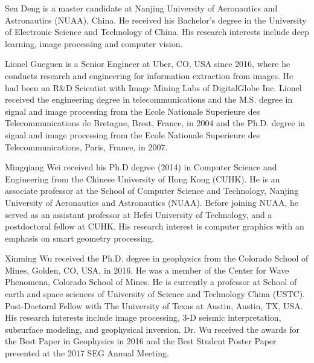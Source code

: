 \documentclass[journal]{IEEEtran}
\begin{document}
\begin{IEEEbiography}{Sen Deng}
is a master candidate at Nanjing University of Aeronautics and Astronautics (NUAA), China. He received his Bachelor's degree in the University of Electronic Science and Technology of China. His research interests include deep learning, image processing and computer vision.
\end{IEEEbiography}


\begin{IEEEbiography}{Lionel Gueguen}
 is a Senior Engineer at Uber, CO, USA since 2016, where he conducts research and engineering for information extraction from images. He had been an R\&D Scientist with Image Mining Labs of DigitalGlobe Inc. Lionel received the engineering degree in telecommunications and the M.S. degree in signal and image processing from the Ecole Nationale Superieure des Telecommunications de Bretagne, Brest, France, in 2004 and the Ph.D. degree in signal and image processing from the Ecole Nationale Superieure des Telecommunications, Paris, France, in 2007.
\end{IEEEbiography}


\begin{IEEEbiography}{Mingqiang Wei}
 received his Ph.D degree (2014) in Computer Science and Engineering from the Chinese University of Hong Kong (CUHK). He is an associate professor at the School of Computer Science and Technology, Nanjing University of Aeronautics and Astronautics (NUAA). Before joining NUAA, he served as an assistant professor at Hefei University of Technology, and a postdoctoral fellow at CUHK. His research interest is computer graphics with an emphasis on smart geometry processing.
\end{IEEEbiography}



\begin{IEEEbiography}{Xinming Wu}
 received the Ph.D. degree in geophysics from the Colorado School of Mines, Golden, CO, USA, in 2016.  He was a member of the Center for Wave Phenomena, Colorado School of Mines. He is currently a professor at School of earth and space sciences of University of Science and Technology China (USTC). Post-Doctoral Fellow with The University of Texas at Austin, Austin, TX, USA. His research interests include image processing, 3-D seismic interpretation, subsurface modeling, and geophysical inversion.  Dr. Wu received the awards for the Best Paper in Geophysics in 2016 and the Best Student Poster Paper presented at the 2017 SEG Annual Meeting.
\end{IEEEbiography}
\end{document}
